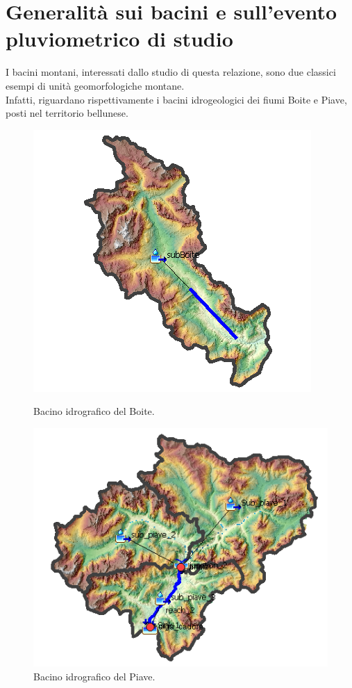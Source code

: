 \section{Generalità sui bacini e sull'evento pluviometrico di studio}
I bacini montani, interessati dallo studio di questa relazione, sono due classici esempi di unità geomorfologiche montane.\\
Infatti, riguardano rispettivamente i bacini idrogeologici dei fiumi Boite e Piave, posti nel territorio bellunese.
\begin{figure}[H]
    \begin{minipage}[]{7cm}
        \includegraphics[scale=0.73]{immagini/bac_boite.PNG}
        \caption{Bacino idrografico del Boite.}
    \label{bacino_boite}    
    \end{minipage}
        \hspace{2cm}
    \begin{minipage}[]{7cm}
        \includegraphics[scale=0.75]{immagini/bac_piave.PNG}
        \caption{Bacino idrografico del Piave.}
    \label{bacino_piave}
    \end{minipage} 
        \end{figure}

